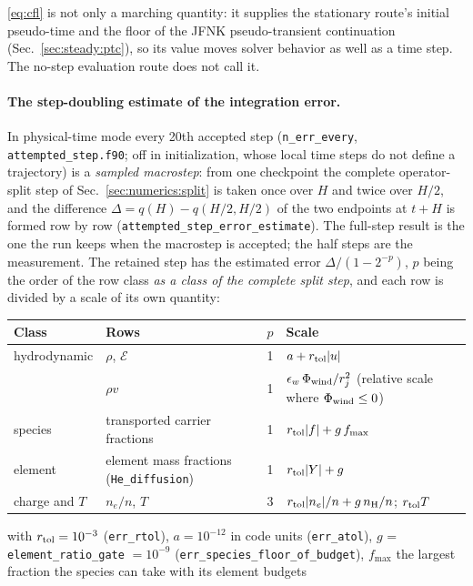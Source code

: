 \eqref{eq:cfl} is not only a marching quantity: it supplies the stationary
route's initial pseudo-time and the floor of the JFNK pseudo-transient
continuation (Sec.~\ref{sec:steady:ptc}), so its value moves solver behavior
as well as a time step.  The no-step evaluation route does not call it.

\paragraph{The step-doubling estimate of the integration error.}
In physical-time mode every 20th accepted step (\texttt{n\_err\_every},
\texttt{attempted\_step.f90}; off in initialization, whose local time steps do
not define a trajectory) is a \emph{sampled macrostep}: from one checkpoint
the complete operator-split step of Sec.~\ref{sec:numerics:split} is taken
once over $H$ and twice over $H/2$, and the difference
$\Delta = q(H) - q(H/2,H/2)$ of the two endpoints at $t+H$ is formed row by
row (\texttt{attempted\_step\_error\_estimate}).  The full-step result is the
one the run keeps when the macrostep is accepted; the half steps are the
measurement.  The retained step has the estimated error
$\Delta/(1-2^{-p})$, $p$ being the order of the row class \emph{as a class
of the complete split step}, and each row is divided by a scale of its own
quantity:
%
\begin{center}\small
\begin{tabular}{@{}llll@{}}
\toprule
Class & Rows & $p$ & Scale \\
\midrule
hydrodynamic & $\rho$, $\mathcal{E}$ & 1 & $a + r_{\rm tol}|u|$ \\
             & $\rho v$ & 1 & $\epsilon_w\,\Phi_{\rm wind}/r_j^2$
                (relative scale where $\Phi_{\rm wind}\le0$) \\
species & transported carrier fractions & 1 &
  $r_{\rm tol}|f| + g\,f_{\max}$ \\
element & element mass fractions (\texttt{He\_diffusion}) & 1 &
  $r_{\rm tol}|Y| + g$ \\
charge and $T$ & $n_e/n$, $T$ & 3 &
  $r_{\rm tol}|n_e|/n + g\,n_{\rm H}/n$; $r_{\rm tol}T$ \\
\bottomrule
\end{tabular}
\end{center}
%
with $r_{\rm tol}=10^{-3}$ (\texttt{err\_rtol}), $a=10^{-12}$ in code units
(\texttt{err\_atol}), $g$ = \texttt{element\_ratio\_gate} $=10^{-9}$
(\texttt{err\_species\_floor\_of\_budget}), $f_{\max}$ the largest fraction
the species can take with its element budgets
